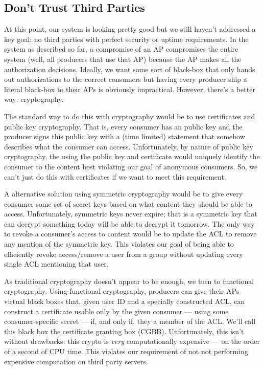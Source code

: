 \documentclass[pdftex,12pt,a4papaer,twoside,notitlepage]{report}
\begin{document}
\subsection{Don't Trust Third Parties}

At this point, our system is looking pretty good but we still haven't addressed
a key goal: no third parties with perfect security or uptime requirements. In
the system as described so far, a compromise of an AP compromises the entire
system (well, all producers that use that AP) because the AP makes all the
authorization decisions. Ideally, we want some sort of black-box that only hands
out authorizations to the correct consumers but having every producer ship a
literal black-box to their APs is obviously impractical. However, there's a
better way: cryptography.

The standard way to do this with cryptography would be to use certificates and
public key cryptography. That is, every consumer has an public key and the
producer signs this public key with a (time limited) statement that somehow
describes what the consumer can access. Unfortunately, by nature of public key
cryptography, the using the public key and certificate would uniquely identify
the consumer to the content host violating our goal of anonymous consumers. So,
we can't just do this with certificates if we want to meet this requirement.

A alternative solution using symmetric cryptography would be to give every
consumer some set of secret keys based on what content they should be able to
access. Unfortunately, symmetric keys never expire; that is a symmetric key that
can decrypt something today will be able to decrypt it tomorrow. The only way to
revoke a consumer's access to content would be to update the ACL to remove any
mention of the symmetric key. This violates our goal of being able to
efficiently revoke access/remove a user from a group without updating every
single ACL mentioning that user.

As traditional cryptography doesn't appear to be enough, we turn to functional
cryptography. Using functional cryptography, producers can give their APs
virtual black boxes that, given user ID and a specially constructed ACL, can
construct a certificate usable only by the given consumer --- using some
consumer-specific secret --- if, and only if, they a member of the ACL. We'll
call this black box the certificate granting box (CGBB). Unfortunately, this
isn't without drawbacks: this crypto is \emph{very} computationally expensive
--- on the order of a second of CPU time. This violates our requirement of not
not performing expensive computation on third party servers.
\end{document}
